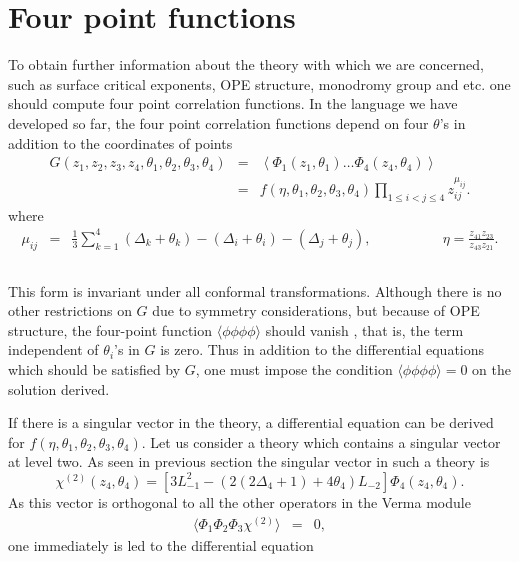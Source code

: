 \documentclass[a4paper,11pt]{article}
\begin{document}
\section{Four point functions}
To obtain further information about the theory with which we are
concerned, such as surface critical exponents, OPE structure,
monodromy group and etc. one should compute four point correlation
functions. In the language we have developed so far, the four
point correlation functions depend on four $\theta$'s in addition
to the coordinates of points
\begin{eqnarray}\label{eq:a40}
G(z_{1},z_{2},z_{3},z_{4},\theta_{1},\theta_{2},\theta_{3},
\theta_{4})&=&\left<\Phi_{1}(z_{1},\theta_{1})\ldots\Phi_{4}
(z_{4},\theta_{4})\right>\nonumber\\
&=&f(\eta,\theta_{1},\theta_{2},\theta_{3},\theta_{4})\prod_{1\leq
i<j\leq4}z_{ij}^{\mu_{ij}} .
\end{eqnarray}
where
\begin{eqnarray}\label{eq:a41}
\mu_{ij}&=&\frac{1}{3}\sum_{k=1}^{4}(\Delta_{k}+\theta_{k})
-(\Delta_{i}+\theta_{i})-(\Delta_{j}+\theta_{j}),
\:\:\:\:\:\:\:\:\:\:\:\:\:\:\:\:\:\:\:\:\:\:\:
\eta=\frac{z_{41}z_{23}}{z_{43}z_{21}}.
\end{eqnarray}

$\:\:\:\:\:\:\:\:\:\:\:\:\:\:\:\:\:\:$

This form is invariant under all conformal transformations.
Although there is no other restrictions on $G$ due to symmetry
considerations, but because of OPE structure, the four-point
function $\langle\phi\phi\phi\phi\rangle$ should vanish
\cite{mog,floh2}, that is, the term independent of $\theta_i$'s in
$G$ is zero. Thus in addition to the differential equations which
should be satisfied by $G$, one must impose the condition
$\langle\phi\phi\phi\phi\rangle=0$ on the solution derived.

If there is a singular vector in the theory, a differential
equation can be derived for
$f(\eta,\theta_{1},\theta_{2},\theta_{3},\theta_{4})$. Let us
consider a theory which contains a singular vector at level two.
As seen in previous section the singular vector in such a theory
is
\begin{equation}\label{eq:a42}
\chi^{(2)}(z_{4},\theta_{4})=\left[3
L_{-1}^{2}-(2(2\Delta_{4}+1)+4\theta_{4})L_{-2}\right]\Phi_{4}(z_{4},\theta_{4})
.
\end{equation}
As this vector is orthogonal to all the other operators in the
Verma module
\begin{eqnarray}\label{eq:a43}
\langle\Phi_{1}\Phi_{2}\Phi_{3}\chi^{(2)}\rangle&=&0 ,
\end{eqnarray}
one immediately is led to the differential equation
\end{document}
